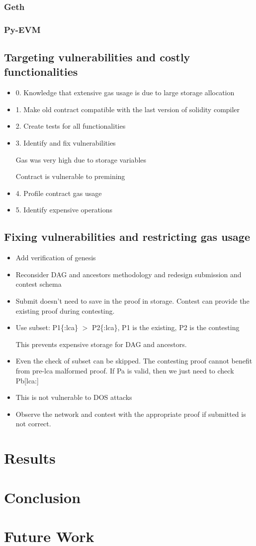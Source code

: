 \documentclass{article}
\begin{document}
\subsubsection{Geth}
\subsubsection{Py-EVM}

\subsection{Targeting vulnerabilities and costly functionalities}
\begin{itemize}
\item 0. Knowledge that extensive gas usage is due to large storage allocation
\item 1. Make old contract compatible with the last version of solidity compiler
\item 2. Create tests for all functionalities
\item 3. Identify and fix vulnerabilities

Gas was very high due to storage variables

Contract is vulnerable to premining
\item 4. Profile contract gas usage
\item 5. Identify expensive operations
\end{itemize}
\subsection{Fixing vulnerabilities and restricting gas usage}

\begin{itemize}

\item Add verification of genesis
\item Reconsider DAG and ancestors methodology and redesign submission and contest schema
\item Submit doesn't need to save in the proof in storage. Contest can provide the existing proof during contesting.

\item Use subset: P1\{:lca\} $>$ P2\{:lca\}, P1 is the existing, P2 is the contesting

This prevents expensive storage for DAG and ancestors.

\item Even the check of subset can be skipped. The contesting proof cannot benefit from pre-lca malformed proof. If Pa is valid, then we just need to check Pb[lca:]

\item This is not vulnerable to DOS attacks

\item Observe the network and contest with the appropriate proof if submitted is not correct.

\end{itemize}

\section{Results}
\section{Conclusion}
\section{Future Work}
\end{document}
